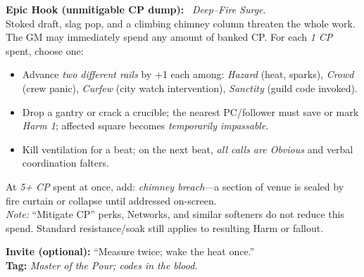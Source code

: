 \documentclass[11pt]{article}
\begin{document}
\textbf{Epic Hook (unmitigable CP dump):} \spadesuit~\emph{Deep–Fire Surge}.\\
Stoked draft, slag pop, and a climbing chimney column threaten the whole work. The GM may immediately spend any amount of banked CP. For each \emph{1 CP} spent, choose one:
\begin{itemize}
  \item Advance \emph{two different rails} by +1 each among: \emph{Hazard} (heat, sparks), \emph{Crowd} (crew panic), \emph{Curfew} (city watch intervention), \emph{Sanctity} (guild code invoked).
  \item Drop a gantry or crack a crucible; the nearest PC/follower must save or mark \emph{Harm 1}; affected square becomes \emph{temporarily impassable}.
  \item Kill ventilation for a beat; on the next beat, \emph{all calls are Obvious} and verbal coordination falters.
\end{itemize}
At \emph{5+ CP} spent at once, add: \emph{chimney breach}—a section of venue is sealed by fire curtain or collapse until addressed on-screen.\\
\emph{Note:} “Mitigate CP” perks, Networks, and similar softeners do not reduce this spend. Standard resistance/soak still applies to resulting Harm or fallout.

\textbf{Invite (optional):} “Measure twice; wake the heat once.”\\
\textbf{Tag:} \emph{Master of the Pour; codes in the blood.}

\end{document}
